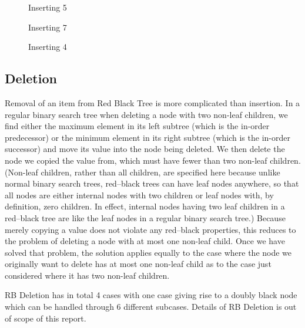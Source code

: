 \documentclass{article}[10pt]
\begin{document}
\begin{figure}
	\centering
	
	\caption{Inserting 5} 
	\label{fig:insert3}
\end{figure}

\begin{figure}
	\centering
	
	\caption{Inserting 7} 
	\label{fig:insert4}
\end{figure}

\begin{figure}
	\centering
	
	\caption{Inserting 4}
	\label{fig:insert5}
\end{figure}

\subsection{Deletion}
Removal of an item from Red  Black Tree is more complicated than insertion. In a regular binary search tree when deleting a node with two non-leaf children, we find either the maximum element in its left subtree (which is the in-order predecessor) or the minimum element in its right subtree (which is the in-order successor) and move its value into the node being deleted. We then delete the node we copied the value from, which must have fewer than two non-leaf children. (Non-leaf children, rather than all children, are specified here because unlike normal binary search trees, red–black trees can have leaf nodes anywhere, so that all nodes are either internal nodes with two children or leaf nodes with, by definition, zero children. In effect, internal nodes having two leaf children in a red–black tree are like the leaf nodes in a regular binary search tree.) Because merely copying a value does not violate any red–black properties, this reduces to the problem of deleting a node with at most one non-leaf child. Once we have solved that problem, the solution applies equally to the case where the node we originally want to delete has at most one non-leaf child as to the case just considered where it has two non-leaf children.

RB Deletion has in total 4 cases with one case giving rise to a doubly black node which can be handled through 6 different subcases. Details of RB Deletion is out of scope of this report. 
\end{document}
